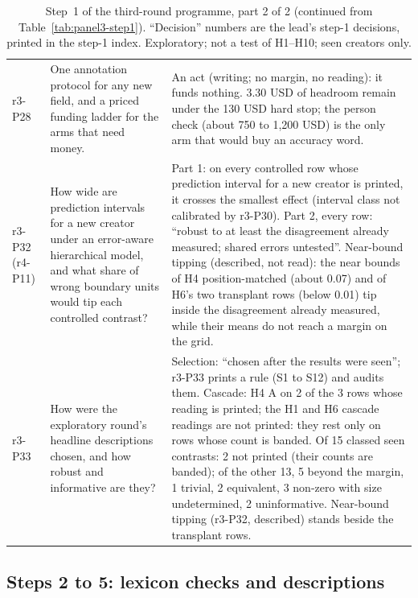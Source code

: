 \begin{table}[tp]
\begin{tabular}{@{}p{}p{}p{}@{}}
r3-P28 & One annotation protocol for any new field, and a priced funding ladder for the arms that need money. & An act
(writing; no margin, no reading): it funds nothing. 3.30 USD of headroom remain under the 130 USD hard stop; the person
check (about 750 to 1,200 USD) is the only arm that would buy an accuracy word. \\
r3-P32 (r4-P11) & How wide are prediction intervals for a new creator under an error-aware hierarchical model, and
what share of wrong boundary units would tip each controlled contrast? & Part 1: on every controlled row whose
prediction interval for a new creator is printed, it crosses the smallest effect (interval class not calibrated by
r3-P30). Part 2, every row: ``robust to at least the disagreement already measured; shared errors untested''.
Near-bound tipping (described, not read): the near bounds of H4 position-matched (about 0.07) and of H6's two
transplant rows (below 0.01) tip inside the disagreement already measured, while their means do not reach a margin on
the grid. \\
r3-P33 & How were the exploratory round's headline descriptions chosen, and how robust and informative are they? &
Selection: ``chosen after the results were seen''; r3-P33 prints a rule (S1 to S12) and audits them. Cascade: H4 A on 2
of the 3 rows whose reading is printed; the H1 and H6 cascade readings are not printed: they rest only on rows whose
count is banded. Of 15 classed seen contrasts: 2 not printed (their counts are banded); of the other 13, 5 beyond the
margin, 1 trivial, 2 equivalent, 3 non-zero with size undetermined, 2 uninformative. Near-bound tipping (r3-P32,
described) stands beside the transplant rows. \\
\bottomrule
\end{tabular}
\caption{Step~1 of the third-round programme, part 2 of 2 (continued from Table~\ref{tab:panel3-step1}). ``Decision''
numbers are the lead's step-1 decisions, printed in the step-1 index. Exploratory; not a test of H1--H10; seen
creators only. \LabelValidity}
\label{tab:panel3-step1b}
\end{table}

\subsection{Steps 2 to 5: lexicon checks and descriptions}
\label{app:panel3-steps25}


